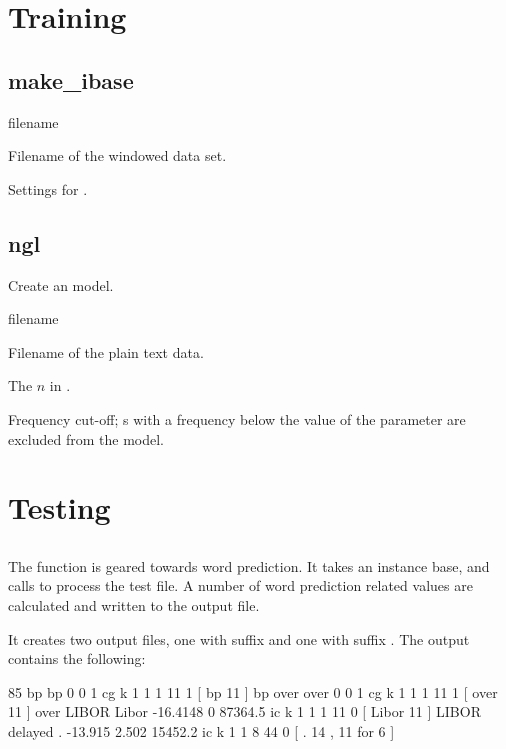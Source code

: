 \documentclass[a4paper,10pt,twoside]{report}
\begin{document}
\section{Training}

\subsection{make\_ibase}

\begin{varlist}{filename}
\item[filename] Filename of the windowed data set.
\item[timbl] Settings for \Timbl{}.
\end{varlist}

\subsection{ngl}

Create an \ngram{} model.

\begin{varlist}{filename}
\item[filename] Filename of the plain text data.
\item[n] The $n$ in \ngram{}.
\item[fco] Frequency cut-off; \ngram{}s with a frequency below the
  value of the  parameter are excluded from the model.
\end{varlist}


\section{Testing}

\subsection{}

The  function is geared towards word prediction. It takes
an instance base, and calls \Timbl{} to process the test file. A
number of word prediction related values are calculated and written to
the output file.

It creates two output files, one with suffix  and one with
suffix .  The  output contains the following:

\begin{wout}{}
85 bp bp 0 0 1 cg k 1 1 1 11 1 [ bp 11 ]
bp over over 0 0 1 cg k 1 1 1 11 1 [ over 11 ]
over LIBOR Libor -16.4148 0 87364.5 ic k 1 1 1 11 0 [ Libor 11 ]
LIBOR delayed . -13.915 2.502 15452.2 ic k 1 1 8 44 0 [ . 14 , 11 for 6 ]
\end{wout}
\end{document}
